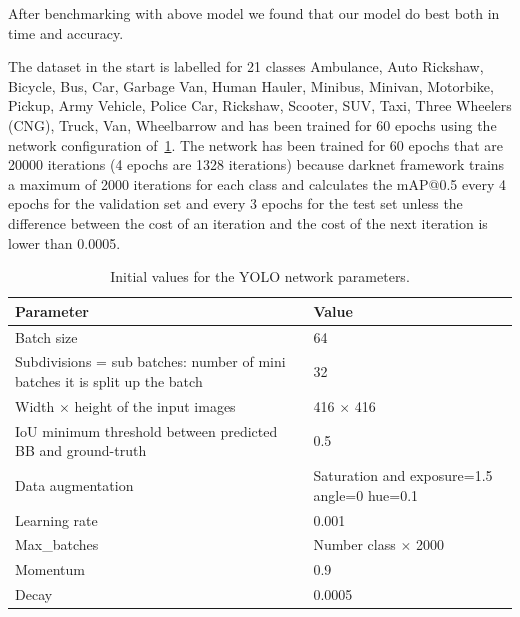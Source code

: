 After benchmarking with above model we found that our model do best both in time and accuracy.

The dataset in the start is labelled for 21 classes {Ambulance, Auto Rickshaw, Bicycle, Bus, Car, Garbage Van, Human Hauler, Minibus, Minivan, Motorbike, Pickup, Army Vehicle, Police Car, Rickshaw, Scooter, SUV, Taxi, Three Wheelers (CNG), Truck, Van, Wheelbarrow} and has been trained for 60 epochs using the network configuration of~\ref{tab:yolo-parameter}.  The  network  has been  trained  for  60  epochs  that  are  20000  iterations  (4 epochs  are
1328 iterations) because darknet framework trains a maximum of 2000 iterations for each class
and calculates the mAP@0.5 every 4 epochs for the validation set and every 3 epochs for the
test set unless the difference between the cost of an iteration and the cost of the next iteration
is lower than 0.0005.


\begin{table}[!h]
  \centering
  \caption[Initial values for the YOLO network parameters.]{Initial values for the YOLO network parameters.}
  \label{tab:yolo-parameter}
  {\renewcommand{\arraystretch}{1.7}
    \begin{tabular}{p{6.5cm} p{4cm}}
          \toprule
          Parameter                                                                         & Value  \\
          \hline
          Batch size                                                                        & 64 \\ 
          Subdivisions = sub batches: number of mini batches it is split up the batch       & 32 \\
          Width $\times$ height of the input images                                         & 416 $\times$ 416  \\
          IoU minimum threshold between predicted BB and ground-truth                       & 0.5 \\
          Data augmentation                                                                 & Saturation and exposure=1.5 angle=0 hue=0.1  \\
          Learning rate                                                                     & 0.001 \\
          Max\_batches                                                                      & Number class $\times$ 2000 \\
          Momentum                                                                          & 0.9 \\
          Decay                                                                             & 0.0005 \\
          \bottomrule
    \end{tabular}
  }
\end{table}

